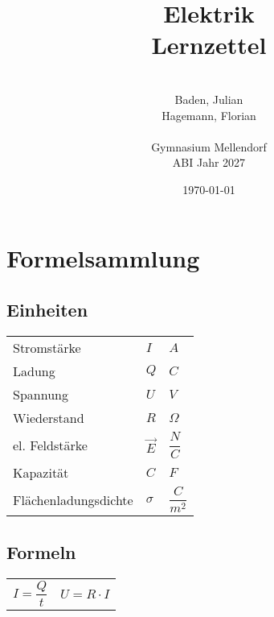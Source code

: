 \documentclass[a4paper]{article}
\title{\Huge{Elektrik\\Lernzettel}}
\date{\today}
\author{\quad\\Baden, Julian\\Hagemann, Florian\\\quad\\Gymnasium Mellendorf\\ABI Jahr 2027}
\begin{document}
\maketitle
\thispagestyle{empty}
\newpage
\tableofcontents \thispagestyle{empty}
\newpage
{}


\section{Formelsammlung}
\subsection{Einheiten}

\begin{center}
    \begin{tabular}{ p{4cm} p{4cm} p{4cm} }
         Stromstärke            & $I$           & $A$                 \\[0,5cm]
         Ladung                 & $Q$           & $C$                 \\[0,5cm]
         Spannung               & $U$           & $V$                 \\[0,5cm]
         Wiederstand            & $R$           & $\Omega$            \\[0,5cm]
         el. Feldstärke         & $\vec{E}$     & $\dfrac{N}{C}$      \\[0,5cm]
         Kapazität              & $C$           & $F$                 \\[0,5cm]
         Flächenladungsdichte   & $\sigma$      & $\dfrac{C}{m^2}$    \\[1cm]
    \end{tabular}
\end{center}


\subsection{Formeln}

\Large
\begin{center} 
    \begin{tabular}{ c c }
        $I = \dfrac{Q}{t}$ \hspace{2cm} &  $U = R \cdot I$    \\[0,5cm]
    \end{tabular}
\end{center} 
\normalsize


\paragraph{}
\end{document}
